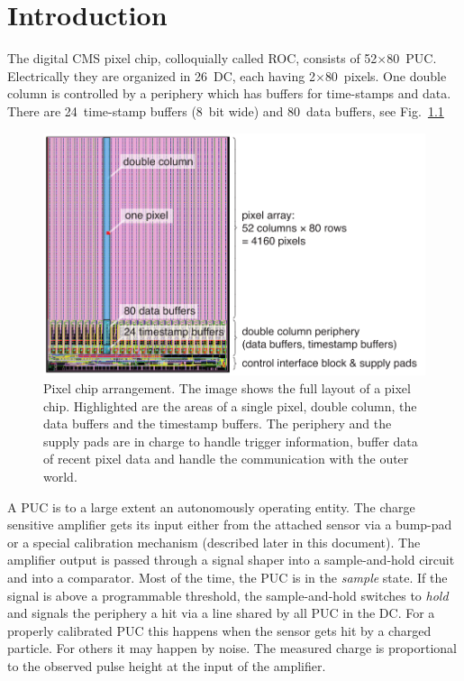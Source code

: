\chapter{Introduction}

The digital CMS pixel chip, colloquially called \gls{ROC}, consists of 52$\times$80~\gls{PUC}. Electrically they are organized in 26~\gls{DC}, each having 2$\times$80~pixels. One double column is controlled by a periphery which has buffers for time-stamps and data. There are 24~time-stamp buffers (8~bit wide) and 80~data buffers, see Fig.~\ref{fig:ROCimage}

\begin{figure}[hbtp]
	\begin{center}
	\includegraphics[width=.9\textwidth]{img/ROCimage.pdf}
	\end{center}
	\caption{Pixel chip arrangement. The image shows the full layout of a pixel chip. Highlighted are the areas of a single pixel, double column, the data buffers and the timestamp buffers. The periphery and the supply pads are in charge to handle trigger information, buffer data of recent pixel data and handle the communication with the outer world.}
	\label{fig:ROCimage}
\end{figure}

A \gls{PUC} is to a large extent an autonomously operating entity. The charge sensitive amplifier gets its input either from the attached sensor via a bump-pad or a special calibration mechanism (described later in this document). The amplifier output is passed through a signal shaper into a sample-and-hold circuit and into a comparator. Most of the time, the \gls{PUC} is in the \emph{sample} state. If the signal is above a programmable threshold, the sample-and-hold switches to \emph{hold} and signals the periphery a hit via a line shared by all \gls{PUC} in the \gls{DC}. For a properly calibrated \gls{PUC} this happens when the sensor gets hit by a charged particle. For others it may happen by noise. The measured charge is proportional to the observed pulse height at the input of the amplifier.

